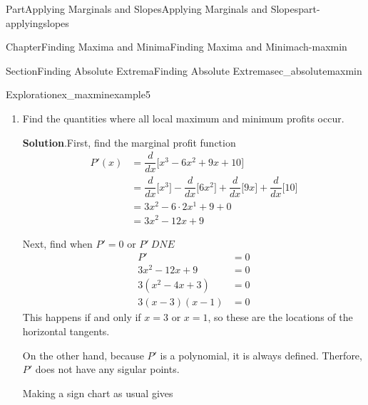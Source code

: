 \documentclass{tufte-book}
\newcommand{\blocktitlefont}{\relax}
\numberwithin{equation}{chapter}
\newcommand{\ddx}[1]{ \dfrac{d}{dx} \Big[ #1 \Big]  }
\newcommand{\amp}{&}
\begin{document}
\begin{partptx}{Part}{Applying Marginals and Slopes}{}{Applying Marginals and Slopes}{}{}{part-applyingslopes}
\begin{chapterptx}{Chapter}{Finding Maxima and Minima}{}{Finding Maxima and Minima}{}{}{ch-maxmin}
\begin{sectionptx}{Section}{Finding Absolute Extrema}{}{Finding Absolute Extrema}{}{}{sec_absolutemaxmin}
\begin{exploration}{Exploration}{}{ex_maxminexample5}
\begin{enumerate}[font=\bfseries,label=(\alph*),ref=\alph*]
\item{}Find the quantities where all local maximum and minimum profits occur.%
\par\smallskip%
\noindent\textbf{\blocktitlefont Solution}.\hypertarget{ex_maxminexample5-2-2}{}\quad{}First, find the marginal profit function%
\begin{align*}
P'(x) \amp  = \ddx{x^3 - 6x^2 + 9x +10 } \\
\amp = \ddx{x^3} - \ddx{ 6x^2 } + \ddx{ 9x } + \ddx{10}\\
\amp = 3x^2 - 6\cdot 2x^1 + 9 + 0\\
\amp = 3x^2 - 12x + 9
\end{align*}
%
\par
Next, find when \(P'=0\) or \(P'\ DNE\)%
\begin{align*}
P' \amp = 0\\
3x^2 - 12x + 9 \amp =0\\
3(x^2 - 4x + 3) \amp =0\\
3(x-3)(x-1) \amp =0
\end{align*}
This happens if and only if \(x=3\) or \(x=1\), so these are the locations of the horizontal tangents.%
\par
On the other hand, because \(P'\) is a polynomial, it is always defined.  Therfore, \(P'\) does not have any sigular points.%
\par
Making a sign chart as usual gives \begin{image}{0.25}{0.5}{0.25}{}%
\end{image}
\end{enumerate}
\end{exploration}
\end{sectionptx}
\end{chapterptx}
\end{partptx}
\end{document}
